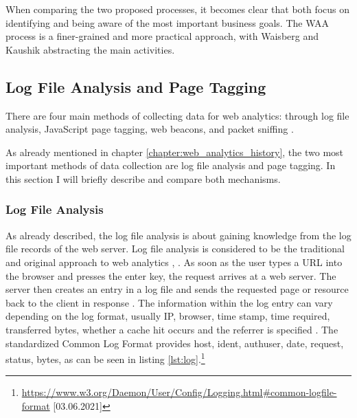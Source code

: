 When comparing the two proposed processes, it becomes clear that both focus on identifying and being aware of the most important business goals.
The WAA process is a finer-grained and more practical approach, with Waisberg and Kaushik abstracting the main activities.






\subsection{Log File Analysis and Page Tagging}
\label{chapter:web_analytics_logfile_pagetagging}

There are four main methods of collecting data for web analytics: through log file analysis, JavaScript page tagging, web beacons, and packet sniffing \cite{2009Waisberg}.

As already mentioned in chapter \ref{chapter:web_analytics_history},  the two most important methods of data collection are log file analysis and page tagging.
In this section I will briefly describe and compare both mechanisms.



\subsubsection{Log File Analysis}
\label{chapter:log_file}


As already described, the log file analysis is about gaining knowledge from the log file records of the web server.
Log file analysis is considered to be the traditional and original approach to web analytics \cite{2011Marek}, \cite{2015Zheng}. %
As soon as the user types a URL into the browser and presses the enter key, the request arrives at a web server.
The server then creates an entry in a log file and sends the requested page or resource back to the client in response \cite{2009Waisberg}.
The information within the log entry can vary depending on the log format, usually IP, browser, time stamp, time required, transferred bytes, whether a cache hit occurs and the referrer is specified \cite{2009Waisberg}.
The standardized Common Log Format provides host, ident, authuser, date, request, status, bytes, as can be seen in listing \ref{lst:log}.\footnote{\url{https://www.w3.org/Daemon/User/Config/Logging.html\#common-logfile-format} [03.06.2021]}

